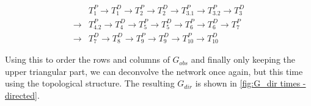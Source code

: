 \documentclass[../Thesis.tex]{subfiles}
\begin{document}
\begin{equation}\label{eq:times topological order}
    \begin{split}
         & T^P_{1} \longrightarrow
        T^D_{1} \longrightarrow
        T^P_{2} \longrightarrow
        T^D_{2} \longrightarrow
        T^P_{3.1} \longrightarrow
        T^P_{3.2} \longrightarrow
        T^D_{3}                      \\
        \longrightarrow
         & T^P_{4.2} \longrightarrow
        T^D_{4} \longrightarrow
        T^P_{5} \longrightarrow
        T^D_{5} \longrightarrow
        T^P_{6} \longrightarrow
        T^D_{6} \longrightarrow
        T^P_{7}                      \\
        \longrightarrow
         & T^D_{7} \longrightarrow
        T^D_{8} \longrightarrow
        T^P_{9} \longrightarrow
        T^D_{9} \longrightarrow
        T^P_{10} \longrightarrow
        T^D_{10}
    \end{split}
\end{equation}\label{eq:times topological order}

Using this to order the rows and columns of $G_{obs}$ and finally only keeping the upper triangular part, we can deconvolve the network once again, but this time using the topological structure. The resulting $G_{dir}$ is shown in \autoref{fig:G_dir times - directed}.
\end{document}
